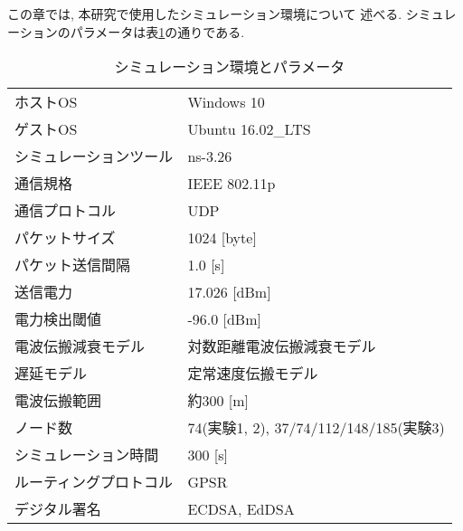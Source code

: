 この章では, 本研究で使用したシミュレーション環境について
述べる. シミュレーションのパラメータは表\ref{tab:simulation_parameter}の通りである.
\setlength{\tabcolsep}{30pt}
\begin{longtable}{ll}
  \caption{シミュレーション環境とパラメータ}
  \label{tab:simulation_parameter}
  \endfirsthead
  \hline
  ホストOS & Windows 10\\
  ゲストOS & Ubuntu 16.02\_LTS\\
  シミュレーションツール & ns-3.26 \\
  通信規格 & IEEE 802.11p \\
  通信プロトコル & UDP \\
  パケットサイズ & 1024 [byte] \\
  パケット送信間隔 & 1.0 [s] \\
  送信電力 & 17.026 [dBm] \\
  電力検出閾値 & -96.0 [dBm] \\
  電波伝搬減衰モデル & 対数距離電波伝搬減衰モデル \\
  遅延モデル & 定常速度伝搬モデル \\
  電波伝搬範囲 & 約300 [m] \\
  ノード数 & 74(実験1, 2), 37/74/112/148/185(実験3) \\
  シミュレーション時間 & 300 [s] \\
  ルーティングプロトコル & GPSR \\
  デジタル署名 & ECDSA, EdDSA \\ \hline
\end{longtable}
\vspace{3em}


\vspace{2em}

\vspace{2em}

\vspace{1em}

\vspace{1em}

\vspace{2em}

